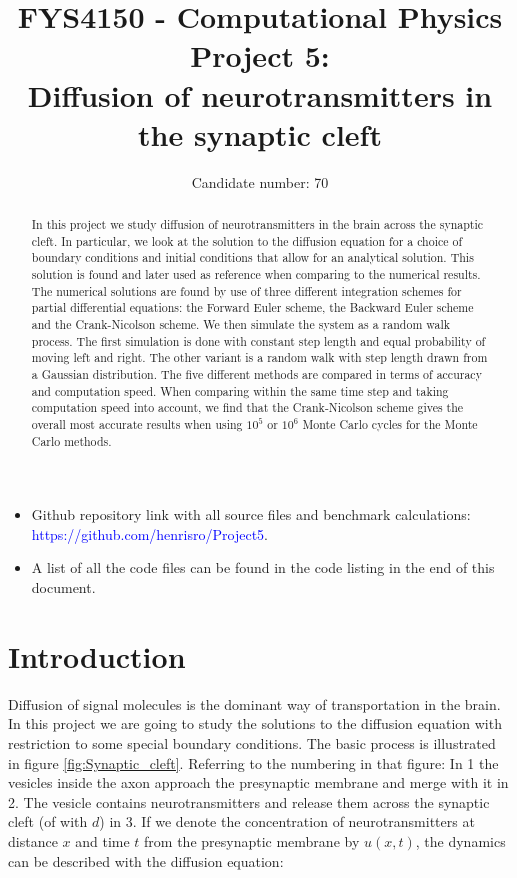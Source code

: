 \documentclass[a4paper, 11pt, notitlepage,english]{article}
\author{Candidate number: 70}
\title{FYS4150 - Computational Physics \\
      Project 5: \\
       Diffusion of neurotransmitters in the synaptic cleft}
\begin{document}
\maketitle

\begin{abstract}
In this project we study diffusion of neurotransmitters in the brain across the synaptic cleft. In particular, we look at the solution to the diffusion equation for a choice of boundary conditions and initial conditions that allow for an analytical solution. This solution is found and later used as reference when comparing to the numerical results. The numerical solutions are found by use of three different integration schemes for partial differential equations: the Forward Euler scheme, the Backward Euler scheme and the Crank-Nicolson scheme. We then simulate the system as a random walk process. The first simulation is done with constant step length and equal probability of moving left and right. The other variant is a random walk with step length drawn from a Gaussian distribution. The five different methods are compared in terms of accuracy and computation speed. When comparing within the same time step and taking computation speed into account, we find that the Crank-Nicolson scheme gives the overall most accurate results when using $10^5$ or $10^6$ Monte Carlo cycles for the Monte Carlo methods. \\
\end{abstract}

\begin{itemize}
\item Github repository link with all source files and benchmark calculations: \\
 \textcolor{blue}{https://github.com/henrisro/Project5}.
\item A list of all the code files can be found in the code listing in the end of this document.
\end{itemize}

\section{Introduction}

Diffusion of signal molecules is the dominant way of transportation in the brain. In this project we are going to study the solutions to the diffusion equation with restriction to some special boundary conditions. The basic process is illustrated in figure \ref{fig:Synaptic_cleft}. Referring to the numbering in that figure: In 1 the vesicles inside the axon approach the presynaptic membrane and merge with it in 2. The vesicle contains neurotransmitters and release them across the synaptic cleft (of with $d$) in 3. If we denote the concentration of neurotransmitters at distance $x$ and time $t$ from the presynaptic membrane by $u(x,t)$, the dynamics can be described with the diffusion equation:
\end{document}
